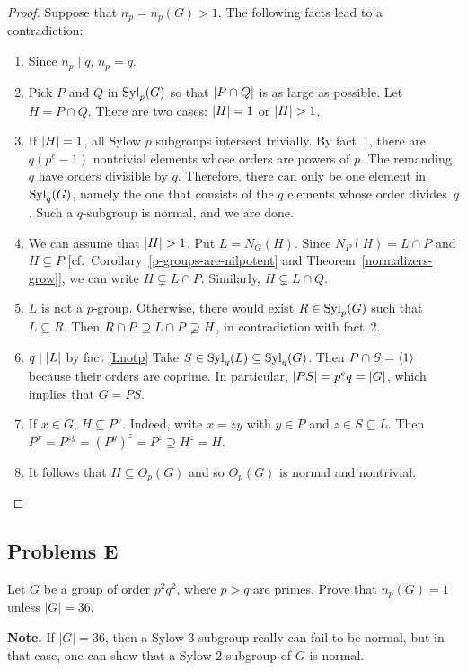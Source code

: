 \begin{proof} Suppose that $n_p=n_p(G)>1$. The following facts lead to a contradiction:
\begin{enumerate}[1.]
    \item Since $n_p\mid q$, $n_p=q$.
    \item Pick $P$ and $Q$ in ${\rm Syl}_p(G)$ so that $\left\vert{P\cap Q}\right\vert$ is as large as possible. Let $H=P\cap Q$. There are two cases: $\left\vert{H}\right\vert=1$ or $\left\vert{H}\right\vert>1$.
    \item If $\left\vert{H}\right\vert=1$, all Sylow $p$ subgroups intersect trivially. By fact~1, there are $q(p^e-1)$ nontrivial elements whose orders are powers of $p$. The remanding $q$ have orders divisible by $q$. Therefore, there can only be one element in ${\rm Syl}_q(G)$, namely the one that consists of the $q$ elements whose order divides~$q$. Such a $q$-subgroup is normal, and we are done.
    \item We can assume that $\left\vert{H}\right\vert>1$. Put $L=N_G(H)$. Since $N_P(H)=L\cap P$ and $H\varsubsetneq P$ [cf.~Corollary~\ref{p-groups-are-nilpotent} and Theorem~\ref{normalizers-grow}], we can write $H\varsubsetneq L\cap P$. Similarly, $H\varsubsetneq L\cap Q$.
    \item\label{Lnotp} $L$ is not a $p$-group. Otherwise, there would exist $R\in{\rm Syl}_p(G)$ such that $L\subseteq R$. Then $R\cap P\supseteq L\cap P\varsupsetneq H$, in contradiction with fact~2.
    \item $q\mid\left\vert{L}\right\vert$ by fact \ref*{Lnotp} Take $S\in{\rm Syl}_q(L)\subseteq{\rm Syl}_q(G)$. Then $P\cap S=\langle1\rangle$ because their orders are coprime. In particular, $\left\vert{PS}\right\vert=p^eq=\left\vert{G}\right\vert$, which implies that $G=PS$.
    \item If $x\in G$, $H\subseteq P^x$. Indeed, write $x=zy$ with $y\in P$ and $z\in S\subseteq L$. Then $P^x=P^{zy}=(P^y)^z=P^z\supseteq H^z=H$.
    \item It follows that $H\subseteq O_p(G)$ and so $O_p(G)$ is normal and nontrivial.
\end{enumerate}
 \end{proof}

\subsection{Problems E}

\begin{probl}
    Let\/ $G$ be a group of order $p^2q^2$, where $p > q$ are primes. Prove that $n_p(G) = 1$ unless $|G| = 36$.

    \textrm{\rm\textbf{Note.} If $|G|=36$, then a Sylow $3$-subgroup really can fail to be normal, but in that case, one can show that a Sylow $2$-subgroup of $G$ is normal.}
\end{probl}

